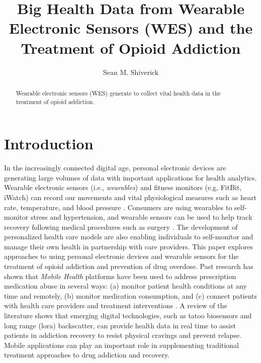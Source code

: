 \documentclass[sigconf]{acmart}
\begin{document}
\title{Big Health Data from Wearable Electronic Sensors (WES) and 
the Treatment of Opioid Addiction}

\author{Sean M. Shiverick}


\begin{abstract}
Wearable electronic sensors (WES) generate to collect
vital health data in the treatment of opioid addiction. 
\end{abstract}


\maketitle


\section{Introduction}

In the increasingly connected digital age, personal electronic devices are 
generating large volumes of data with important applications for health analytics. 
Wearable electronic sensors (i.e., \emph{wearables}) and fitness monitors 
(e.g, FitBit, iWatch) can record our movements and vital physiological measures 
such as heart rate, temperature, and blood pressure \cite{metcalf16}. Consumers 
are using wearables to self-monitor stress and hypertension, and wearable sensors 
can be used to help track recovery following medical procedures such as surgery 
\cite{atallah11}. The development of personalized health care models are also 
enabling individuals to self-monitor and manage their own health in partnership 
with care providers. This paper explores approaches to using personal electronic 
devices and wearable sensors for the treatment of opioid addiction and prevention 
of drug overdose. Past research has shown that \emph{Mobile Health} platforms
have been used to address prescription medication abuse in several ways: (a) 
monitor patient health conditions at any time and remotely, (b) monitor medication 
consumption, and (c) connect patients with health care providers and treatment 
interventions \cite{Varshney14}. A review of the literature shows that emerging 
digital technologies, such as tatoo biosensors and long range (lora) backscatter, 
can provide health data in real time to assist patients in addiction recovery to 
resist physical cravings and prevent relapse. Mobile applications can play an 
important role in supplementing traditional treatment approaches to drug 
addiction and recovery. 
\end{document}
